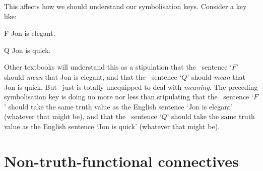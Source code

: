 This affects how we should understand our symbolisation keys. Consider a key like:
	\begin{ekey}
		\item[F] Jon is elegant.
		\item[Q] Jon is quick.
	\end{ekey}
Other textbooks will understand this as a stipulation that the \TFL\ sentence `$F$' should \emph{mean} that Jon is elegant, and that the \TFL\ sentence `$Q$' should \emph{mean} that Jon is quick. But \TFL\ just is totally unequipped to deal with \emph{meaning}. The preceding symbolisation key is doing no more nor less than stipulating that the \TFL\ sentence `$F$' should take the same truth value as the English sentence `Jon is elegant' (whatever that might be), and that the \TFL\ sentence `$Q$' should take the same truth value as the English sentence `Jon is quick' (whatever that might be). 

\section{Non-truth-functional connectives}

